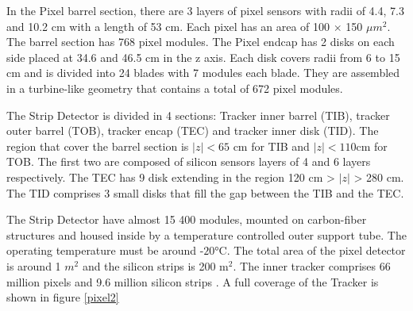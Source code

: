 In the Pixel barrel section, there are 3 layers of pixel sensors with radii of 4.4, 7.3 and 10.2 cm with a length of 53 cm. Each pixel has an area of 100 $\times$ 150 $\mu m^2$. The barrel section has 768 pixel modules.
The Pixel endcap has 2 disks on each side placed at 34.6 and 46.5 cm in the z axis. Each disk covers radii from 6 to 15 cm and is divided into 24 blades with 7 modules each blade.
They are assembled in a turbine-like geometry that contains a total of 672 pixel modules. %


The Strip Detector is divided in 4 sections: Tracker inner barrel (TIB), tracker outer barrel (TOB), tracker encap (TEC) and tracker inner disk (TID). The region that cover the barrel section is $|z|<65$ cm for TIB and $|z|<110$cm for TOB. The first two are composed of silicon sensors layers of 4 and 6 layers respectively. The TEC has 9 disk extending in the region 120 cm > $|z|$ > 280 cm. The 
TID comprises 3 small disks that fill the gap between the TIB and the TEC.


The Strip Detector have almost 15 400 modules, mounted on
carbon-fiber structures and housed inside by a temperature controlled outer support tube. The operating temperature must be around -$\ang{20}$C. 
The total area of the pixel detector is around 1 $m^2$ and the silicon strips is 200 m$^2$. 
The inner tracker comprises 66 million pixels and 9.6
million silicon strips \cite{cms-manual}.
A full coverage of the Tracker is shown in figure \ref{pixel2}


